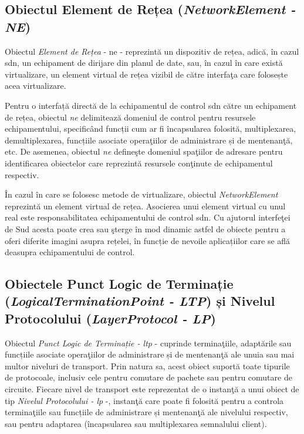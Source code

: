 \subsection{Obiectul Element de Rețea (\textit{NetworkElement - NE})}

Obiectul \textit{Element de Rețea} - \gls{ne} - reprezintă un dispozitiv de rețea, adică, în cazul \gls{sdn}, un echipament de dirijare din planul de date, sau, în cazul în care există virtualizare, un element virtual de rețea vizibil de către interfaţa care folosește acea virtualizare.

Pentru o interfață directă de la echipamentul de control \gls{sdn} către un echipament de rețea, obiectul \textit{\gls{ne}} delimitează domeniul de control pentru resursele echipamentului, specificând funcții cum ar fi încapsularea folosită, multiplexarea, demultiplexarea, funcțiile asociate operaţiilor de administrare și de mentenanţă, etc. De asemenea, obiectul \textit{\gls{ne}} defineşte domeniul spaţiilor de adresare pentru identificarea obiectelor care reprezintă resursele conţinute de echipamentul respectiv.

În cazul în care se folosesc metode de virtualizare, obiectul \textit{NetworkElement} reprezintă un element virtual de rețea. Asocierea unui element virtual cu unul real este responsabilitatea echipamentului de control \gls{sdn}. Cu ajutorul interfeţei de Sud acesta poate crea sau şterge în mod dinamic astfel de obiecte pentru a oferi diferite imagini asupra rețelei, în funcție de nevoile aplicațiilor care se află deasupra echipamentului de control.

\subsection{Obiectele Punct Logic de Terminație (\textit{LogicalTerminationPoint - LTP}) și Nivelul Protocolului (\textit{LayerProtocol - LP})}

Obiectul \textit{Punct Logic de Terminație - \gls{ltp}} - cuprinde terminaţiile, adaptările sau funcțiile asociate operaţiilor de administrare și de mentenanţă ale unuia sau mai multor niveluri de transport. Prin natura sa, acest obiect suportă toate tipurile de protocoale, inclusiv cele pentru comutare de pachete sau pentru comutare de circuite. Fiecare nivel de transport este reprezentat de o instanţă a unui obiect de tip \textit{Nivelul Protocolului - \gls{lp}} -, instanţă care poate fi folosită pentru a controla terminaţiile sau funcțiile de administrare și mentenanţă ale nivelului respectiv, sau pentru adaptarea (încapsularea sau multiplexarea semnalului client).

